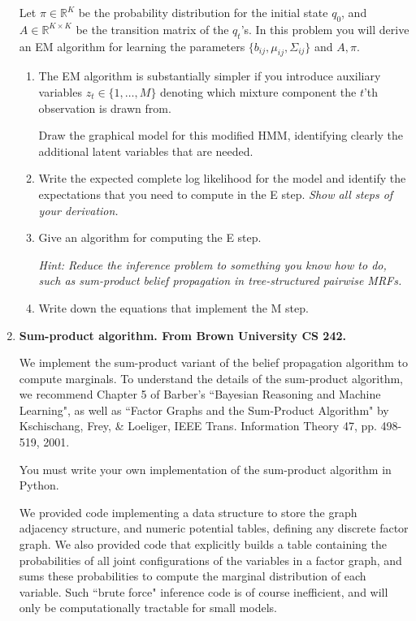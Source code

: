 \documentclass{article}
\newcommand{\real}{\ensuremath{\mathbb{R}}}
\begin{document}
\begin{enumerate}
Let $\pi \in \real^K$ be the probability distribution for the initial state $q_0$,
and $A \in \real^{K \times K}$ be the transition matrix of the $q_t$'s.
In this problem you will derive an EM algorithm for learning the parameters $\{ b_{ij}, \mu_{ij}, \Sigma_{ij} \}$ and $A, \pi$.

\begin{enumerate}
\item The EM algorithm is substantially simpler if you introduce auxiliary variables $z_t\in \{1, \ldots, M\}$ denoting which mixture component the $t$'th observation is drawn from.

Draw the graphical model for this modified HMM, identifying
  clearly the additional latent variables that are needed.
\item Write the expected complete log likelihood for the model
  and identify the expectations that you need to compute in the E
  step. {\em Show all steps of your derivation.}

\item Give an algorithm for computing the E step.

{\em Hint: Reduce the inference problem to something you know how to do, such as sum-product belief propagation in tree-structured pairwise MRFs.}

\item Write down the equations that implement the M step.
\end{enumerate}




\item {\bf Sum-product algorithm. From Brown University CS 242. } 

We implement the sum-product variant of the belief propagation algorithm to compute marginals. To understand the details of the sum-product algorithm, we recommend Chapter 5 of Barber's ``Bayesian Reasoning and Machine Learning", as well as ``Factor Graphs and the Sum-Product Algorithm" by Kschischang, Frey, \& Loeliger, IEEE Trans. Information Theory 47, pp. 498-519, 2001.

You must write your own  implementation of the sum-product algorithm in Python.

We  provided code implementing a data structure to store the graph adjacency structure, and numeric potential tables, defining any discrete factor graph. We also provided code that explicitly builds a table containing the probabilities of all joint configurations of the variables in a factor graph, and sums these probabilities to compute the marginal
distribution of each variable. Such ``brute force" inference code is of course inefficient, and will only be computationally tractable for small models.


\end{enumerate}
\end{document}
